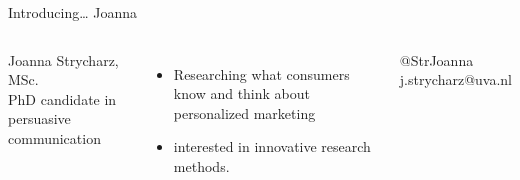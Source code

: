\documentclass{beamer}
\begin{document}
\begin{frame}{Introducing\ldots} {\huge{Joanna}} \small{} 
	\begin{columns}[]    Joanna Strycharz, MSc. \\ 
	PhD candidate in persuasive communication
 \begin{itemize} \item Researching what consumers know and think about personalized marketing
 \item interested in innovative research methods. \end{itemize} @StrJoanna ~~ j.strycharz@uva.nl \end{columns} \end{frame}
\end{document}
